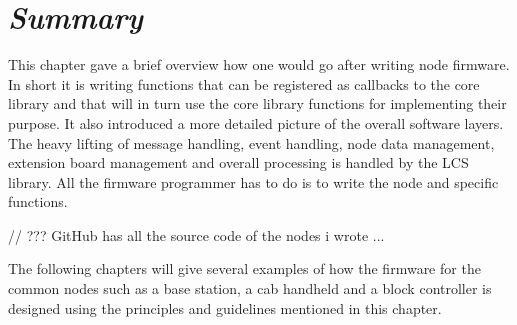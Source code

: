 \section{\textit{Summary}}

This chapter gave a brief overview how one would go after writing node firmware. In short it is writing functions that can be registered as callbacks to the core library and that will in turn use the core library functions for implementing their purpose. It also introduced a more detailed picture of the overall software layers. The heavy lifting of message handling, event handling, node data management, extension board management and overall processing is handled by the LCS library. All the firmware programmer has to do is to write the node and specific functions. 


// ??? GitHub has all the source code of the nodes i wrote ...


The following chapters will give several examples of how the firmware for the common nodes such as a base station, a cab handheld and a block controller is designed using the principles and guidelines mentioned in this chapter.

